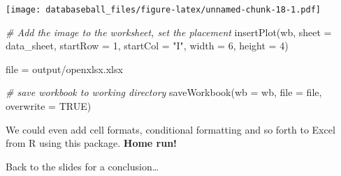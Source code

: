 \documentclass[
]{article}
\newenvironment{Shaded}{\begin{snugshade}}{\end{snugshade}}
\newcommand{\AttributeTok}[1]{\textcolor[rgb]{0.77,0.63,0.00}{#1}}
\newcommand{\CommentTok}[1]{\textcolor[rgb]{0.56,0.35,0.01}{\textit{#1}}}
\newcommand{\ConstantTok}[1]{\textcolor[rgb]{0.00,0.00,0.00}{#1}}
\newcommand{\DecValTok}[1]{\textcolor[rgb]{0.00,0.00,0.81}{#1}}
\newcommand{\FunctionTok}[1]{\textcolor[rgb]{0.00,0.00,0.00}{#1}}
\newcommand{\NormalTok}[1]{#1}
\newcommand{\OtherTok}[1]{\textcolor[rgb]{0.56,0.35,0.01}{#1}}
\newcommand{\StringTok}[1]{\textcolor[rgb]{0.31,0.60,0.02}{#1}}
\begin{document}
\texttt{[image: databaseball\_files/figure-latex/unnamed-chunk-18-1.pdf]}

\begin{Shaded}
\begin{Highlighting}[]
\CommentTok{\# Add the image to the worksheet, set the placement}
\FunctionTok{insertPlot}\NormalTok{(wb, }\AttributeTok{sheet =}\NormalTok{ data\_sheet, }\AttributeTok{startRow =} \DecValTok{1}\NormalTok{, }\AttributeTok{startCol =} \StringTok{"I"}\NormalTok{, }\AttributeTok{width =} \DecValTok{6}\NormalTok{, }\AttributeTok{height =} \DecValTok{4}\NormalTok{)}

\NormalTok{file }\OtherTok{=} \StringTok{\textquotesingle{}output/openxlsx.xlsx\textquotesingle{}}

\CommentTok{\# save workbook to working directory}
\FunctionTok{saveWorkbook}\NormalTok{(}\AttributeTok{wb =}\NormalTok{ wb, }\AttributeTok{file =}\NormalTok{ file, }\AttributeTok{overwrite =} \ConstantTok{TRUE}\NormalTok{)}
\end{Highlighting}
\end{Shaded}

We could even add cell formats, conditional formatting and so forth to
Excel from R using this package. \textbf{Home run!}

Back to the slides for a conclusion\ldots{}
\end{document}
